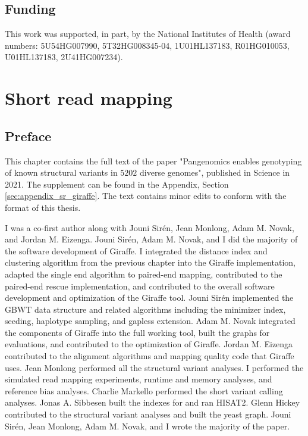 \documentclass[11pt]{ucscthesis}
\begin{document}
\section{Funding}
This work was supported, in part, by the National Institutes of Health (award numbers: 5U54HG007990, 5T32HG008345-04, 1U01HL137183, R01HG010053, U01HL137183, 2U41HG007234).

\chapter{Short read mapping}
\label{chapter:sr-giraffe}
\section{Preface}
This chapter contains the full text of the paper "Pangenomics enables genotyping of known structural variants in $5202$ diverse genomes"\cite{sr_giraffe_2021}, published in Science in 2021.
The supplement can be found in the Appendix, Section \ref{sec:appendix_sr_giraffe}.
The text contains minor edits to conform with the format of this thesis.

I was a co-first author along with Jouni Sirén, Jean Monlong, Adam M. Novak, and Jordan M. Eizenga.
Jouni Sirén, Adam M. Novak, and I did the majority of the software development of Giraffe.
I integrated the distance index and clustering algorithm from the previous chapter into the Giraffe implementation, adapted the single end algorithm to paired-end mapping, contributed to the paired-end rescue implementation, and contributed to the overall software development and optimization of the Giraffe tool.
Jouni Sirén implemented the GBWT data structure and related algorithms including the minimizer index, seeding, haplotype sampling, and gapless extension.
Adam M. Novak integrated the components of Giraffe into the full working tool, built the graphs for evaluations, and contributed to the optimization of Giraffe.
Jordan M. Eizenga contributed to the alignment algorithms and mapping quality code that Giraffe uses.
Jean Monlong performed all the structural variant analyses.
I performed the simulated read mapping experiments, runtime and memory analyses, and reference bias analyses. 
Charlie Markello performed the short variant calling analyses.
Jonas A. Sibbesen built the indexes for and ran HISAT2.
Glenn Hickey contributed to the structural variant analyses and built the yeast graph.
Jouni Sirén, Jean Monlong, Adam M. Novak, and I wrote the majority of the paper. 

\newpage
\end{document}
